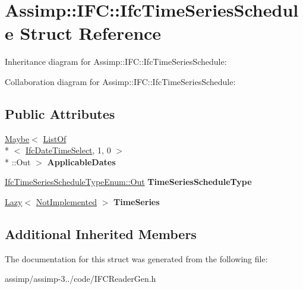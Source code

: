 \hypertarget{struct_assimp_1_1_i_f_c_1_1_ifc_time_series_schedule}{\section{Assimp\+:\+:I\+F\+C\+:\+:Ifc\+Time\+Series\+Schedule Struct Reference}
\label{struct_assimp_1_1_i_f_c_1_1_ifc_time_series_schedule}
}


Inheritance diagram for Assimp\+:\+:I\+F\+C\+:\+:Ifc\+Time\+Series\+Schedule\+:


Collaboration diagram for Assimp\+:\+:I\+F\+C\+:\+:Ifc\+Time\+Series\+Schedule\+:
\subsection*{Public Attributes}
\begin{DoxyCompactItemize}
\item 
\hypertarget{struct_assimp_1_1_i_f_c_1_1_ifc_time_series_schedule_ae35447e73cc17183c3d3dd38326e767c}{\hyperlink{struct_assimp_1_1_s_t_e_p_1_1_maybe}{Maybe}$<$ \hyperlink{struct_assimp_1_1_s_t_e_p_1_1_list_of}{List\+Of}\\*
$<$ \hyperlink{class_assimp_1_1_s_t_e_p_1_1_e_x_p_r_e_s_s_1_1_data_type}{Ifc\+Date\+Time\+Select}, 1, 0 $>$\\*
\+::Out $>$ {\bfseries Applicable\+Dates}}\label{struct_assimp_1_1_i_f_c_1_1_ifc_time_series_schedule_ae35447e73cc17183c3d3dd38326e767c}

\item 
\hypertarget{struct_assimp_1_1_i_f_c_1_1_ifc_time_series_schedule_ad3972051be99147d4ef62ea4dc7ef289}{\hyperlink{classboost_1_1shared__ptr}{Ifc\+Time\+Series\+Schedule\+Type\+Enum\+::\+Out} {\bfseries Time\+Series\+Schedule\+Type}}\label{struct_assimp_1_1_i_f_c_1_1_ifc_time_series_schedule_ad3972051be99147d4ef62ea4dc7ef289}

\item 
\hypertarget{struct_assimp_1_1_i_f_c_1_1_ifc_time_series_schedule_a2c5556e323fa71aeef9efb5f114fe765}{\hyperlink{struct_assimp_1_1_s_t_e_p_1_1_lazy}{Lazy}$<$ \hyperlink{struct_assimp_1_1_i_f_c_1_1_not_implemented}{Not\+Implemented} $>$ {\bfseries Time\+Series}}\label{struct_assimp_1_1_i_f_c_1_1_ifc_time_series_schedule_a2c5556e323fa71aeef9efb5f114fe765}

\end{DoxyCompactItemize}
\subsection*{Additional Inherited Members}


The documentation for this struct was generated from the following file\+:\begin{DoxyCompactItemize}
\item 
assimp/assimp-\/3../code/I\+F\+C\+Reader\+Gen.\+h\end{DoxyCompactItemize}
